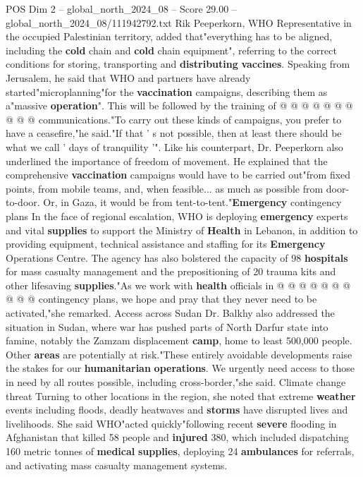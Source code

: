 \begin{textsample}{POS Dim 2 – global\_north\_2024\_08 – Score 29.00 – global\_north\_2024\_08/111942792.txt}
Rik Peeperkorn, WHO Representative in the occupied Palestinian territory, added that"everything has to be aligned, including the \textbf{cold} chain and \textbf{cold} chain equipment", referring to the correct conditions for storing, transporting and \textbf{distributing} \textbf{vaccines}.
Speaking from Jerusalem, he said that WHO and partners have already started"microplanning"for the \textbf{vaccination} campaigns, describing them as a"massive \textbf{operation}".
This will be followed by the training of @ @ @ @ @ @ @ @ @ @ communications."To carry out these kinds of campaigns, you prefer to have a ceasefire,"he said."If that ' s not possible, then at least there should be what we call ' days of tranquility '".
Like his counterpart, Dr.
Peeperkorn also underlined the importance of freedom of movement.
He explained that the comprehensive \textbf{vaccination} campaigns would have to be carried out"from fixed points, from mobile teams, and, when feasible... as much as possible from door-to-door.
Or, in Gaza, it would be from tent-to-tent."\textbf{Emergency} contingency plans In the face of regional escalation, WHO is deploying \textbf{emergency} experts and vital \textbf{supplies} to support the Ministry of \textbf{Health} in Lebanon, in addition to providing equipment, technical assistance and staffing for its \textbf{Emergency} Operations Centre.
The agency has also bolstered the capacity of 98 \textbf{hospitals} for mass casualty management and the prepositioning of 20 trauma kits and other lifesaving \textbf{supplies}."As we work with \textbf{health} officials in @ @ @ @ @ @ @ @ @ @ contingency plans, we hope and pray that they never need to be activated,"she remarked.
Access across Sudan Dr.
Balkhy also addressed the situation in Sudan, where war has pushed parts of North Darfur state into famine, notably the Zamzam displacement \textbf{camp}, home to least 500,000 people.
Other \textbf{areas} are potentially at risk."These entirely avoidable developments raise the stakes for our \textbf{humanitarian} \textbf{operations}.
We urgently need access to those in need by all routes possible, including cross-border,"she said.
Climate change threat Turning to other locations in the region, she noted that extreme \textbf{weather} events including floods, deadly heatwaves and \textbf{storms} have disrupted lives and livelihoods.
She said WHO"acted quickly"following recent \textbf{severe} flooding in Afghanistan that killed 58 people and \textbf{injured} 380, which included dispatching 160 metric tonnes of \textbf{medical} \textbf{supplies}, deploying 24 \textbf{ambulances} for referrals, and activating mass casualty management systems.

\end{textsample}

